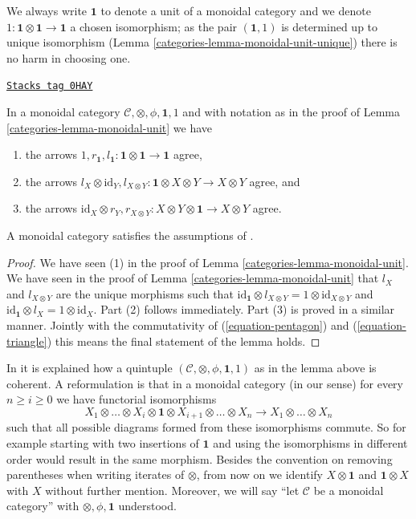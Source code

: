 We always write $\mathbf{1}$ to denote a unit of a monoidal category
and we denote $1 : \mathbf{1} \otimes \mathbf{1} \to \mathbf{1}$
a chosen isomorphism; as the pair $(\mathbf{1}, 1)$ is determined
up to unique isomorphism (Lemma \ref{categories-lemma-monoidal-unit-unique})
there is no harm in choosing one.

\begin{lemma}
\label{categories-lemma-monoidal-coherence}
\href{https://stacks.math.columbia.edu/tag/0HAY}{\texttt{Stacks tag 0HAY}}

In a monoidal category $\mathcal{C}, \otimes, \phi, \mathbf{1}, 1$
and with notation as in the proof of Lemma \ref{categories-lemma-monoidal-unit}
we have
\begin{enumerate}
\item the arrows $1, r_\mathbf{1}, l_\mathbf{1} :
\mathbf{1} \otimes \mathbf{1} \to \mathbf{1}$ agree,
\item the arrows
$l_X \otimes \text{id}_Y, l_{X \otimes Y} :
\mathbf{1} \otimes X \otimes Y \to X \otimes Y$ agree, and
\item the arrows
$\text{id}_X \otimes r_Y , r_{X \otimes Y} :
X \otimes Y \otimes \mathbf{1} \to X \otimes Y$ agree.
\end{enumerate}
A monoidal category satisfies the assumptions of
\cite[Theorem 5.2]{associativity}.
\end{lemma}

\begin{proof}

We have seen (1) in the proof of Lemma \ref{categories-lemma-monoidal-unit}.
We have seen in the proof of Lemma \ref{categories-lemma-monoidal-unit}
that $l_X$ and $l_{X \otimes Y}$ are
the unique morphisms such that
$\text{id}_\mathbf{1} \otimes l_{X \otimes Y} =
1 \otimes \text{id}_{X \otimes Y}$ and
$\text{id}_\mathbf{1} \otimes l_X = 1 \otimes \text{id}_X$.
Part (2) follows immediately. Part (3) is proved in a similar manner.
Jointly with the commutativity of (\ref{equation-pentagon})
and (\ref{equation-triangle}) this means the final statement of
the lemma holds.
\end{proof}

In \cite[Theorem 5.2]{associativity} it is explained how a quintuple
$(\mathcal{C}, \otimes, \phi, \mathbf{1}, 1)$ as in the lemma above
is coherent. A reformulation is that in a monoidal category (in our sense)
for every $n \geq i \geq 0$ we have functorial isomorphisms
$$
X_1 \otimes \ldots \otimes X_i \otimes \mathbf{1}
\otimes X_{i + 1} \otimes \ldots \otimes X_n
\to
X_1 \otimes \ldots \otimes X_n
$$
such that all possible diagrams formed from these isomorphisms
commute. So for example starting with two insertions of $\mathbf{1}$
and using the isomorphisms in different order would result in the same
morphism. Besides the convention on removing parentheses when writing
iterates of $\otimes$, from now on we identify $X \otimes \mathbf{1}$ and
$\mathbf{1} \otimes X$ with $X$ without further mention.
Moreover, we will say ``let $\mathcal{C}$ be a monoidal category''
with $\otimes, \phi, \mathbf{1}$ understood.

